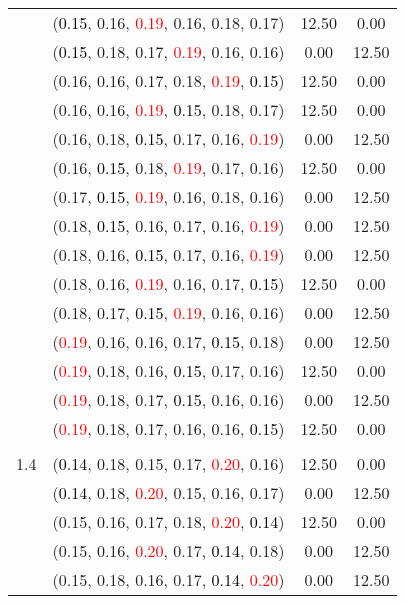 \documentclass[10pt,a4paper]{report}
\begin{document}
\begin{center}
\begin{longtable}{clcc}
			&(\textcolor{black}{0.15}, 0.16, \textcolor{red}{0.19}, 0.16, 0.18, 0.17)&12.50&0.00\\
			&(\textcolor{black}{0.15}, 0.18, 0.17, \textcolor{red}{0.19}, 0.16, 0.16)&0.00&12.50\\
			&(0.16, 0.16, 0.17, 0.18, \textcolor{red}{0.19}, \textcolor{black}{0.15})&12.50&0.00\\
			&(0.16, 0.16, \textcolor{red}{0.19}, \textcolor{black}{0.15}, 0.18, 0.17)&12.50&0.00\\
			&(0.16, 0.18, \textcolor{black}{0.15}, 0.17, 0.16, \textcolor{red}{0.19})&0.00&12.50\\
			&(0.16, \textcolor{black}{0.15}, 0.18, \textcolor{red}{0.19}, 0.17, 0.16)&12.50&0.00\\
			&(0.17, \textcolor{black}{0.15}, \textcolor{red}{0.19}, 0.16, 0.18, 0.16)&0.00&12.50\\
			&(0.18, \textcolor{black}{0.15}, 0.16, 0.17, 0.16, \textcolor{red}{0.19})&0.00&12.50\\
			&(0.18, 0.16, \textcolor{black}{0.15}, 0.17, 0.16, \textcolor{red}{0.19})&0.00&12.50\\
			&(0.18, 0.16, \textcolor{red}{0.19}, 0.16, 0.17, \textcolor{black}{0.15})&12.50&0.00\\
			&(0.18, 0.17, \textcolor{black}{0.15}, \textcolor{red}{0.19}, 0.16, 0.16)&0.00&12.50\\
			&(\textcolor{red}{0.19}, 0.16, 0.16, 0.17, \textcolor{black}{0.15}, 0.18)&0.00&12.50\\
			&(\textcolor{red}{0.19}, 0.18, 0.16, \textcolor{black}{0.15}, 0.17, 0.16)&12.50&0.00\\
			&(\textcolor{red}{0.19}, 0.18, 0.17, \textcolor{black}{0.15}, 0.16, 0.16)&0.00&12.50\\
			&(\textcolor{red}{0.19}, 0.18, 0.17, 0.16, 0.16, \textcolor{black}{0.15})&12.50&0.00\\
		&&&\\
		1.4			&(\textcolor{black}{0.14}, 0.18, 0.15, 0.17, \textcolor{red}{0.20}, 0.16)&12.50&0.00\\
			&(\textcolor{black}{0.14}, 0.18, \textcolor{red}{0.20}, 0.15, 0.16, 0.17)&0.00&12.50\\
			&(0.15, 0.16, 0.17, 0.18, \textcolor{red}{0.20}, \textcolor{black}{0.14})&12.50&0.00\\
			&(0.15, 0.16, \textcolor{red}{0.20}, 0.17, \textcolor{black}{0.14}, 0.18)&0.00&12.50\\
			&(0.15, 0.18, 0.16, 0.17, \textcolor{black}{0.14}, \textcolor{red}{0.20})&0.00&12.50\\

\end{longtable}
\end{center}
\end{document}

